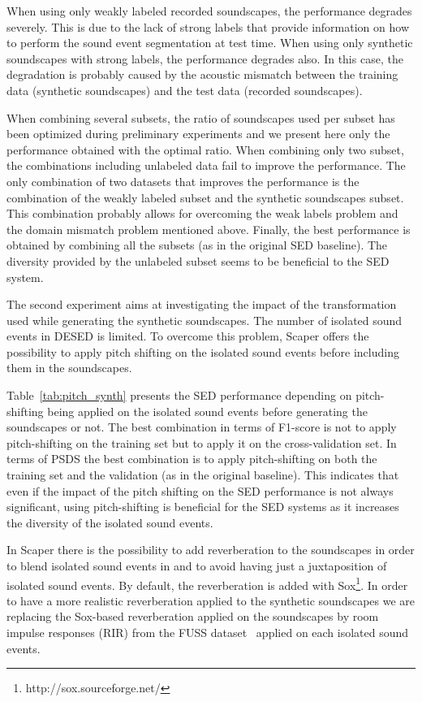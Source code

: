 \documentclass{article}
\begin{document}
\begin{sloppy}
When using only weakly labeled recorded soundscapes, the performance degrades severely. This is due to the lack of strong labels that provide information on how to perform the sound event segmentation at test time. When using only synthetic soundscapes with strong labels, the performance degrades also. In this case, the degradation is probably caused by the acoustic mismatch between the training data (synthetic soundscapes) and the test data (recorded soundscapes).

When combining several subsets, the ratio of soundscapes used per subset has been optimized during preliminary experiments and we present here only the performance obtained with the optimal ratio. When combining only two subset, the combinations including unlabeled data fail to improve the performance. The only combination of two datasets that improves the performance is the combination of the weakly labeled subset and the synthetic soundscapes subset. This combination probably allows for overcoming the weak labels problem and the domain mismatch problem mentioned above. Finally, the best performance is obtained by combining all the subsets (as in the original SED baseline). The diversity provided by the unlabeled subset seems to be beneficial to the SED system.

The second experiment aims at investigating the impact of the transformation used while generating the synthetic soundscapes. The number of isolated sound events in DESED is limited. To overcome this problem, Scaper offers the possibility to apply pitch shifting on the isolated sound events before including them in the soundscapes.

Table~\ref{tab:pitch_synth} presents the SED performance depending on pitch-shifting being applied on the isolated sound events before generating the soundscapes or not. The best combination in terms of F1-score is not to apply pitch-shifting on the training set but to apply it on the cross-validation set. In terms of PSDS the best combination is to apply pitch-shifting on both the training set and the validation (as in the original baseline). This indicates that even if the impact of the pitch shifting on the SED performance is not always significant, using pitch-shifting is beneficial for the SED systems as it increases the diversity of the isolated sound events.

In Scaper there is the possibility to add reverberation to the soundscapes in order to blend isolated sound events in and to avoid having just a juxtaposition of isolated sound events. By default, the reverberation is added with Sox\footnote{http://sox.sourceforge.net/}. In order to have a more realistic reverberation applied to the synthetic soundscapes we are replacing the Sox-based reverberation applied on the soundscapes by room impulse responses (RIR) from the FUSS dataset~\cite{fuss} applied on each isolated sound events.


\end{sloppy}
\end{document}
